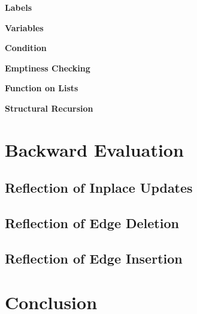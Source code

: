 \documentclass{llncs}
\begin{document}
\textbf{Labels}

\textbf{Variables}

\textbf{Condition}

\textbf{Emptiness Checking}

\textbf{Function on Lists}

\textbf{Structural Recursion}


\section{Backward Evaluation}\label{sec:bak}

\subsection{Reflection of Inplace Updates}\label{subsec:bak-inp}

\subsection{Reflection of Edge Deletion}\label{subsec:bak-del}

\subsection{Reflection of Edge Insertion}\label{subsec:bak-ins}
\section{Conclusion}\label{sec:con}
\end{document}
